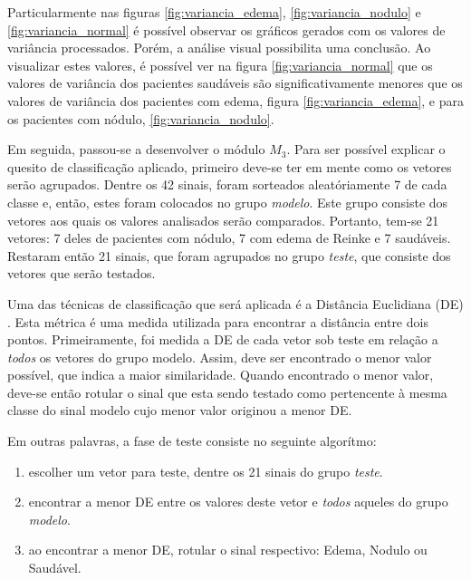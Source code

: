 \documentclass[a4paper,12pt,oneside]{report}
\begin{document}
\par Particularmente nas figuras \ref{fig:variancia_edema}, \ref{fig:variancia_nodulo} e \ref{fig:variancia_normal} \'{e} poss\'{i}vel observar os gr\'{a}ficos gerados com os valores de va\-ri\-\^{a}n\-ci\-a processados. Por\'{e}m, a an\'{a}lise visual possibilita uma conclus\~{a}o. Ao visualizar estes valores, \'{e} poss\'{i}vel ver na figura \ref{fig:variancia_normal} que os valores de vari\^{a}ncia dos pacientes saud\'{a}veis s\~{a}o significativamente menores que os valores de vari\^{a}ncia dos pacientes com edema, figura \ref{fig:variancia_edema}, e para os pacientes com n\'{o}dulo, \ref{fig:variancia_nodulo}. 
\\
\par Em seguida, passou-se a desenvolver o m\'{o}dulo $M_3$. Para ser poss\'{i}vel explicar o quesito de classifica\c{c}\~{a}o aplicado, primeiro deve-se ter em mente como os vetores ser\~{a}o agrupados. Dentre os 42 sinais, foram sorteados aleat\'{o}riamente 7 de cada classe e, ent\~{a}o, estes foram colocados no grupo \emph{modelo}. Este grupo consiste dos vetores aos quais os valores analisados ser\~{a}o comparados. Portanto, tem-se 21 vetores: 7 deles de pacientes com n\'{o}dulo, 7 com edema de Reinke e 7 saud\'{a}veis. Restaram ent\~{a}o 21 sinais, que foram agrupados no grupo \emph{teste}, que consiste dos vetores que ser\~{a}o testados.
\\
\par Uma das t\'{e}cnicas de classifica\c{c}\~{a}o que ser\'{a} aplicada \'{e} a Dist\^{a}ncia Euclidiana (DE) \cite{distancia_euclidiana}. Esta m\'{e}trica \'{e} uma medida utilizada para encontrar a dist\^{a}ncia entre dois pontos. Primeiramente, foi medida a DE de cada vetor sob teste em rela\c{c}\~{a}o a \emph{todos} os vetores do grupo modelo. Assim, deve ser encontrado o menor valor poss\'{i}vel, que indica a maior similaridade. Quando encontrado o menor valor, deve-se ent\~{a}o rotular o sinal que esta sendo testado como pertencente \`{a} mesma classe do sinal modelo cujo menor valor originou a menor DE. 
\\
\par Em outras palavras, a fase de teste consiste no seguinte algor\'{i}tmo:
\begin{enumerate}
\item escolher um vetor para teste, dentre os 21 sinais do grupo \emph{teste}.
\item encontrar a menor DE entre os valores deste vetor e \emph{todos} aqueles do grupo \emph{modelo}.
\item ao encontrar a menor DE, rotular o sinal respectivo: Edema, Nodulo ou Saud\'{a}vel.
\end{enumerate}
\end{document}
